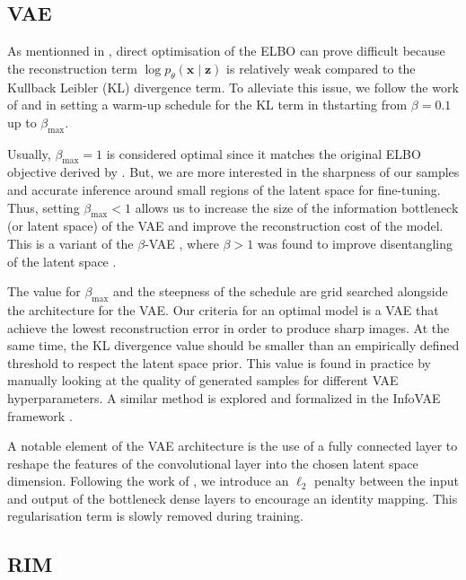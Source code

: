 \subsection{VAE}\label{sec:vae training}

As mentionned in \citet{Kingma2019}, direct optimisation 
of the ELBO can prove difficult because the reconstruction term $\log p_\theta (\mathbf{x} \mid \mathbf{z})$ 
is relatively weak compared to the Kullback Leibler (KL) divergence term. To alleviate this issue, 
we follow the work of \citet{Bowman2015} and \citet{Sonderby2016} in setting a warm-up 
schedule for the KL term in thstarting from $\beta=0.1$ up to $\beta_{\mathrm{max}}$. 

Usually, 
$\beta_{\mathrm{max}} = 1$ is considered optimal since it matches the original ELBO  
objective derived by \citet{Kingma2013}. 
But, we are more interested in the 
sharpness of our samples and accurate inference around small regions of the latent 
space for fine-tuning. Thus, setting $\beta_{\mathrm{max}} < 1$ allows us to increase 
the size of the information bottleneck (or latent space) of the VAE 
and improve the reconstruction cost of the model. 
This is a variant of the $\beta$-VAE \citep{Higgins2017}, where $\beta > 1$ was found 
to improve disentangling of the latent space \citep{Burgess2018}. 

The value for $\beta_\mathrm{max}$ and the steepness of the schedule 
are grid searched alongside the architecture for the VAE. Our criteria 
for an optimal model is a VAE that achieve the lowest reconstruction error 
in order to produce sharp images. At the same time, the 
KL divergence value should be smaller than an empirically defined threshold to respect 
the latent space prior. 
This value is found in practice by 
manually looking at the quality of generated samples for different VAE 
hyperparameters. A similar method is explored and formalized in the 
InfoVAE framework \citep{Zhao2017}.


A notable element of the VAE architecture is the use of a fully connected  
layer to reshape the features of the convolutional layer into the chosen 
latent space dimension. Following the work of \citet{Lanusse2021}, we introduce 
an $\ell_{2}$ penalty between the input and output of the bottleneck 
dense layers to encourage an identity mapping. This regularisation 
term is slowly removed during training.

\subsection{RIM}\label{sec:rimtraining}

